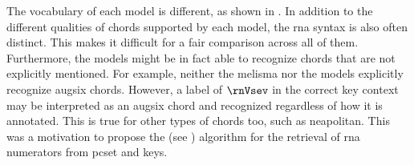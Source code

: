 
The vocabulary of each model is different, as shown in
. In addition to the different
qualities of chords supported by each model, the \gls{rna}
syntax is also often distinct. This makes it difficult for a
fair comparison across all of them. Furthermore, the models
might be in fact able to recognize chords that are not
explicitly mentioned. For example, neither the \gls{melisma}
nor the \textcite{mcleod2021modular} models explicitly
recognize \gls{augsix} chords. However, a label of $\rnVsev$
in the correct key context may be interpreted as an
\gls{augsix} chord and recognized regardless of how it is
annotated. This is true for other types of chords too, such
as \gls{neapolitan}. This was a motivation to propose the
\algorithmrn{} (see
)
algorithm for the retrieval of \gls{rna} numerators from
\gls{pcset} and keys. 

